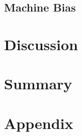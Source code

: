 \documentclass{article}
\begin{document}
\subsection{Machine Bias}


\section{Discussion}


\section{Summary}


\newpage
\section{Appendix}


\medskip
\small


\end{document}
